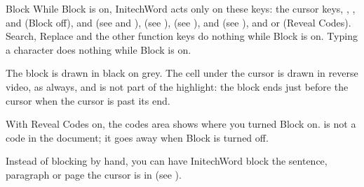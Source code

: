 \begin{Feature}{Block}
While Block is on, InitechWord acts only on these keys: the cursor keys,
, ,  and  (Block off),  and  (see
 and ),  (see ),  (see ),  and
 (see ), and  or 
(Reveal Codes).  Search, Replace and the other function keys do nothing
while Block is on.
Typing a character does nothing while Block is on.

The block is drawn in black on grey.  The cell under the cursor is drawn in
reverse video, as always, and is not part of the highlight: the block ends
just before the cursor when the cursor is past its end.

With Reveal Codes on, the codes area shows \Code{[Block]} where you turned
Block on.  \Code{[Block]} is not a code in the document; it goes away when
Block is turned off.

Instead of blocking by hand, you can have InitechWord block the sentence,
paragraph or page the cursor is in (see ).

\end{Feature}

